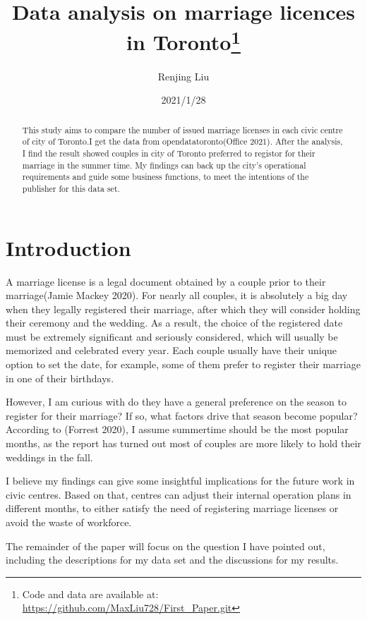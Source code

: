 \documentclass[
]{article}
\title{Data analysis on marriage licences in Toronto\thanks{Code and data are available at: \url{https://github.com/MaxLiu728/First_Paper.git}}}
\author{Renjing Liu}
\date{2021/1/28}
\begin{document}
\maketitle
\begin{abstract}
This study aims to compare the number of issued marriage licenses in each civic centre of city of Toronto.I get the data from opendatatoronto(Office 2021). After the analysis, I find the result showed couples in city of Toronto preferred to registor for their marriage in the summer time. My findings can back up the city's operational requirements and guide some business functions, to meet the intentions of the publisher for this data set.
\end{abstract}

\newpage

\hypertarget{introduction}{%
\section{Introduction}\label{introduction}}

A marriage license is a legal document obtained by a couple prior to their marriage(Jamie Mackey 2020). For nearly all couples, it is absolutely a big day when they legally registered their marriage, after which they will consider holding their ceremony and the wedding. As a result, the choice of the registered date must be extremely significant and seriously considered, which will usually be memorized and celebrated every year. Each couple usually have their unique option to set the date, for example, some of them prefer to register their marriage in one of their birthdays.

However, I am curious with do they have a general preference on the season to register for their marriage? If so, what factors drive that season become popular? According to (Forrest 2020), I assume summertime should be the most popular months, as the report has turned out most of couples are more likely to hold their weddings in the fall.

I believe my findings can give some insightful implications for the future work in civic centres. Based on that, centres can adjust their internal operation plans in different months, to either satisfy the need of registering marriage licenses or avoid the waste of workforce.

The remainder of the paper will focus on the question I have pointed out, including the descriptions for my data set and the discussions for my results.
\end{document}
